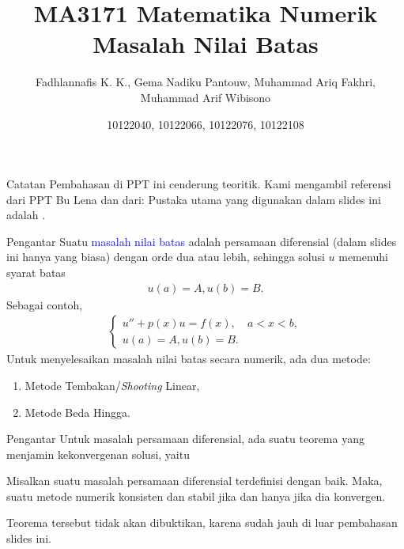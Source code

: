 \documentclass[xcolor={dvipsnames}, 9pt]{beamer}
\title{MA3171 Matematika Numerik \\ \textbf{Masalah Nilai Batas}}
\author{Fadhlannafis K. K., Gema Nadiku Pantouw, Muhammad Ariq Fakhri, Muhammad Arif Wibisono}
\date{10122040, 10122066, 10122076, 10122108}
\renewcommand{\emph}[1]{\textcolor{Blue}{#1}}
\begin{document}
	\begin{frame}[plain]
		\maketitle
	\end{frame}
	\begin{frame}{Catatan}
		Pembahasan di PPT ini cenderung teoritik. Kami mengambil referensi dari PPT Bu Lena dan dari:
		\nocite{*}
		\printbibliography
		Pustaka utama yang digunakan dalam slides ini adalah \cite{Ascher1995Numerical}.
	\end{frame}
	\begin{frame}{Pengantar}
		Suatu \emph{masalah nilai batas} adalah persamaan diferensial (dalam slides ini hanya yang biasa) dengan orde dua atau lebih, sehingga solusi $u$ memenuhi syarat batas
		\begin{align*}
			u(a) = A, u(b) = B.
		\end{align*}
		Sebagai contoh,
		\begin{align*}
			\begin{cases}
				u'' + p(x)u = f(x), & a<x<b, \\
				u(a) = A, u(b) = B.
			\end{cases}
		\end{align*}
		Untuk menyelesaikan masalah nilai batas secara numerik, ada dua metode:
		\begin{enumerate}
			\item Metode Tembakan/\textit{Shooting} Linear,
			\item Metode Beda Hingga.
		\end{enumerate}
	\end{frame}
	\begin{frame}{Pengantar}
		Untuk masalah persamaan diferensial, ada suatu teorema yang menjamin kekonvergenan solusi, yaitu
		\begin{theorem}
			Misalkan suatu masalah persamaan diferensial terdefinisi dengan baik. Maka, suatu metode numerik konsisten dan stabil jika dan hanya jika dia konvergen.
		\end{theorem}
		Teorema tersebut tidak akan dibuktikan, karena sudah jauh di luar pembahasan slides ini.
	\end{frame}
\end{document}
